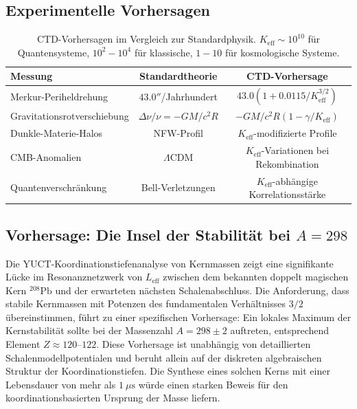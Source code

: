 \documentclass[11pt,a4paper]{article}
\begin{document}
	\subsection{Experimentelle Vorhersagen}
	
	\begin{table}[htbp]
		\centering
		\begin{tabular}{lcc}
			\toprule
			\textbf{Messung} & \textbf{Standardtheorie} & \textbf{CTD-Vorhersage} \\
			\midrule
			Merkur-Periheldrehung & $43.0''$/Jahrhundert & $43.0(1 + 0.0115/K_{\mathrm{eff}}^{3/2})$ \\
			Gravitationsrotverschiebung & $\Delta\nu/\nu = -GM/c^2R$ & $-GM/c^2R(1 - \gamma/K_{\mathrm{eff}})$ \\
			Dunkle-Materie-Halos & NFW-Profil & $K_{\mathrm{eff}}$-modifizierte Profile \\
			CMB-Anomalien & $\Lambda$CDM & $K_{\mathrm{eff}}$-Variationen bei Rekombination \\
			Quantenverschränkung & Bell-Verletzungen & $K_{\mathrm{eff}}$-abhängige Korrelationsstärke \\
			\bottomrule
		\end{tabular}
		\caption{CTD-Vorhersagen im Vergleich zur Standardphysik. $K_{\mathrm{eff}} \sim 10^{10}$ für Quantensysteme, $10^2-10^4$ für klassische, $1-10$ für kosmologische Systeme.}
	\end{table}
	
	\subsection{Vorhersage: Die Insel der Stabilität bei $A=298$}
	
	Die YUCT-Koordinationstiefenanalyse von Kernmassen zeigt eine signifikante Lücke im Resonanznetzwerk von $L_{\mathrm{eff}}$ zwischen dem bekannten doppelt magischen Kern $^{208}\mathrm{Pb}$ und der erwarteten nächsten Schalenabschluss. Die Anforderung, dass stabile Kernmassen mit Potenzen des fundamentalen Verhältnisses $3/2$ übereinstimmen, führt zu einer spezifischen Vorhersage: Ein lokales Maximum der Kernstabilität sollte bei der Massenzahl $A = 298 \pm 2$ auftreten, entsprechend Element $Z \approx 120$--$122$. Diese Vorhersage ist unabhängig von detaillierten Schalenmodellpotentialen und beruht allein auf der diskreten algebraischen Struktur der Koordinationstiefen. Die Synthese eines solchen Kerns mit einer Lebensdauer von mehr als $1\ \mu\text{s}$ würde einen starken Beweis für den koordinationsbasierten Ursprung der Masse liefern.
	
\end{document}

